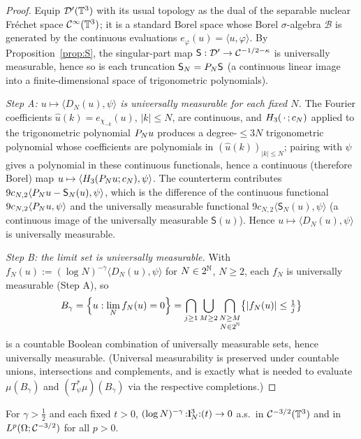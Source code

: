 \begin{proof}
Equip $\mathcal{D}'(\mathbb{T}^3)$ with its usual topology as the dual of the separable
nuclear Fr\'echet space $\mathcal{C}^\infty(\mathbb{T}^3)$; it is a standard Borel space whose
Borel $\sigma$-algebra $\mathcal B$ is generated by the continuous evaluations
$e_\varphi(u)=\langle u,\varphi\rangle$. By Proposition~\ref{prop:S}, the
singular-part map $\mathsf S:\mathcal{D}'\to\mathcal{C}^{-1/2-\kappa}$ is universally
measurable, hence so is each truncation $\mathsf S_N=P_N\mathsf S$ (a continuous
linear image into a finite-dimensional space of trigonometric polynomials).

\emph{Step A: $u\mapsto\langle D_N(u),\psi\rangle$ is universally measurable for
each fixed $N$.} The Fourier coefficients $\widehat u(k)=e_{\chi_{-k}}(u)$,
$|k|\le N$, are continuous, and $H_3(\,\cdot\,;c_N)$ applied to the
trigonometric polynomial $P_N u$ produces a degree-$\le 3N$ trigonometric
polynomial whose coefficients are polynomials in $(\widehat u(k))_{|k|\le N}$;
pairing with $\psi$ gives a polynomial in these continuous functionals, hence a
continuous (therefore Borel) map $u\mapsto\langle H_3(P_N u;c_N),\psi\rangle$.
The counterterm contributes $9c_{N,2}\langle P_N u-\mathsf S_N(u),\psi\rangle$,
which is the difference of the continuous functional
$9c_{N,2}\langle P_N u,\psi\rangle$ and the universally measurable functional
$9c_{N,2}\langle\mathsf S_N(u),\psi\rangle$ (a continuous image of the universally
measurable $\mathsf S(u)$). Hence $u\mapsto\langle D_N(u),\psi\rangle$ is
universally measurable.

\emph{Step B: the limit set is universally measurable.} With
$f_N(u):=(\log N)^{-\gamma}\langle D_N(u),\psi\rangle$ for $N\in2^{\mathbb{N}}$, $N\ge2$,
each $f_N$ is universally measurable (Step A), so
\[
B_\gamma=\Bigl\{u:\lim_N f_N(u)=0\Bigr\}
=\bigcap_{j\ge1}\bigcup_{M\ge2}\bigcap_{\substack{N\ge M\\ N\in2^{\mathbb{N}}}}\bigl\{|f_N(u)|\le\tfrac1j\bigr\}
\]
is a countable Boolean combination of universally measurable sets, hence
universally measurable. (Universal measurability is preserved under countable
unions, intersections and complements, and is exactly what is needed to evaluate
$\mu(B_\gamma)$ and $(T_\psi^*\mu)(B_\gamma)$ via the respective completions.)
\end{proof}

\begin{qonelemma}\label{lem:cube}
For $\gamma>\tfrac12$ and each fixed $t>0$,
$(\log N)^{-\gamma}\,{:}\mathbf{l}_N^3{:}(t)\to0$ a.s.\ in $\mathcal{C}^{-3/2}(\mathbb{T}^3)$ and in
$L^p(\Omega;\mathcal{C}^{-3/2})$ for all $p>0$.
\end{qonelemma}


